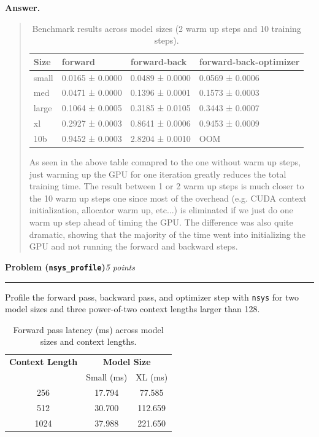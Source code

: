 \documentclass[11pt]{article}
\newcommand{\problem}[2]{%
  \vspace{0.6em}%
  \noindent\textbf{Problem (\texttt{#1})}\hfill\textit{#2 points}\par%
  \vspace{0.2em}\hrule\vspace{0.4em}%
}
\newenvironment{answer}{%
  \vspace{0.3em}%
  \noindent\textbf{Answer.}\begin{quote}%
}{%
  \end{quote}\vspace{0.4em}%
}
\begin{document}
\begin{answer}
  \begin{table}[H]
    \centering
    \caption{Benchmark results across model sizes (2 warm up steps and 10 training steps).}
    \label{tab:model-benchmark-results-two-warmups}
    \begin{tabular}{llll}
    \toprule
    Size & forward & forward-back & forward-back-optimizer \\
    \midrule
    small & 0.0165 ± 0.0000 & 0.0489 ± 0.0000 & 0.0569 ± 0.0006 \\
    med & 0.0471 ± 0.0000 & 0.1396 ± 0.0001 & 0.1573 ± 0.0003 \\
    large & 0.1064 ± 0.0005 & 0.3185 ± 0.0105 & 0.3443 ± 0.0007 \\
    xl & 0.2927 ± 0.0003 & 0.8641 ± 0.0006 & 0.9453 ± 0.0009 \\
    10b & 0.9452 ± 0.0003 & 2.8204 ± 0.0010 & OOM \\
    \bottomrule
    \end{tabular}
    \end{table}      

    As seen in the above table comapred to the one without warm up steps, just warming up the GPU for one iteration greatly reduces the total training time. The result between 1 or 2 warm up steps is much closer to the 10 warm up steps one since most of the overhead (e.g. CUDA context initialization, allocator warm up, etc...) is eliminated if we just do one warm up step ahead of timing the GPU. The difference was also quite dramatic, showing that the majority of the time went into initializing the GPU and not running the forward and backward steps.
\end{answer}


\problem{nsys\_profile}{5}

Profile the forward pass, backward pass, and optimizer step with \texttt{nsys} for two model sizes and three power-of-two context lengths larger than 128.

\begin{table}[h]
  \centering
  \begin{tabular}{c|cc}
  \toprule
  \textbf{Context Length} & \multicolumn{2}{c}{\textbf{Model Size}} \\
   & Small (ms) & XL (ms) \\
  \midrule
  256  & 17.794 & 77.585 \\
  512  & 30.700 & 112.659 \\
  1024 & 37.988 & 221.650 \\
  \bottomrule
  \end{tabular}
  \caption{Forward pass latency (ms) across model sizes and context lengths.}
  \label{tab:latency}
  \end{table}
\end{document}
